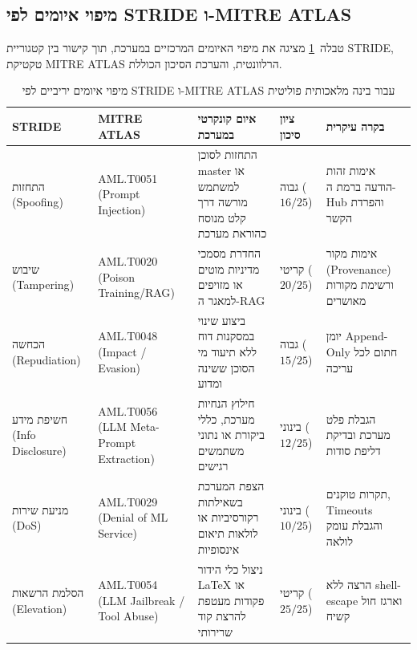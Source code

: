 \subsection{מיפוי איומים לפי \textenglish{STRIDE} ו-\textenglish{MITRE ATLAS}}
טבלה~\ref{tab:stride-atlas} מציגה את מיפוי האיומים המרכזיים במערכת, תוך קישור בין קטגוריית \textenglish{STRIDE}, טקטיקת \textenglish{MITRE ATLAS} הרלוונטית, והערכת הסיכון הכוללת.

\begin{table}[htbp]
\centering
\caption{מיפוי איומים יריביים לפי \textenglish{STRIDE} ו-\textenglish{MITRE ATLAS} עבור בינה מלאכותית פוליטית}
\label{tab:stride-atlas}
\begin{tabular}{p{2.2cm} p{3.0cm} p{4.2cm} p{1.8cm} p{3.1cm}}
\toprule
\textbf{\textenglish{STRIDE}} & \textbf{\textenglish{MITRE ATLAS}} & \textbf{איום קונקרטי במערכת} & \textbf{ציון סיכון} & \textbf{בקרה עיקרית} \\
\midrule
התחזות (\textenglish{Spoofing}) & \textenglish{AML.T0051} (\textenglish{Prompt Injection}) & התחזות לסוכן \textenglish{master} או למשתמש מורשה דרך קלט מנוסח כהוראת מערכת & גבוה ($16/25$) & אימות זהות הודעה ברמת ה-\textenglish{Hub} והפרדת הקשר \\
שיבוש (\textenglish{Tampering}) & \textenglish{AML.T0020} (\textenglish{Poison Training/RAG}) & החדרת מסמכי מדיניות מוטים או מזויפים למאגר ה-\textenglish{RAG} & קריטי ($20/25$) & אימות מקור (\textenglish{Provenance}) ורשימת מקורות מאושרים \\
הכחשה (\textenglish{Repudiation}) & \textenglish{AML.T0048} (\textenglish{Impact / Evasion}) & ביצוע שינוי במסקנות דוח ללא תיעוד מי הסוכן ששינה ומדוע & גבוה ($15/25$) & יומן \textenglish{Append-Only} חתום לכל עריכה \\
חשיפת מידע (\textenglish{Info Disclosure}) & \textenglish{AML.T0056} (\textenglish{LLM Meta-Prompt Extraction}) & חילוץ הנחיות מערכת, כללי ביקורת או נתוני משתמשים רגישים & בינוני ($12/25$) & הגבלת פלט מערכת ובדיקת דליפת סודות \\
מניעת שירות (\textenglish{DoS}) & \textenglish{AML.T0029} (\textenglish{Denial of ML Service}) & הצפת המערכת בשאילתות רקורסיביות או לולאות תיאום אינסופיות & בינוני ($10/25$) & תקרות טוקנים, \textenglish{Timeouts} והגבלת עומק לולאה \\
הסלמת הרשאות (\textenglish{Elevation}) & \textenglish{AML.T0054} (\textenglish{LLM Jailbreak / Tool Abuse}) & ניצול כלי הידור \textenglish{LaTeX} או פקודות מעטפת להרצת קוד שרירותי & קריטי ($25/25$) & הרצה ללא \textenglish{shell-escape} וארגז חול קשיח \\
\bottomrule
\end{tabular}
\end{table}

